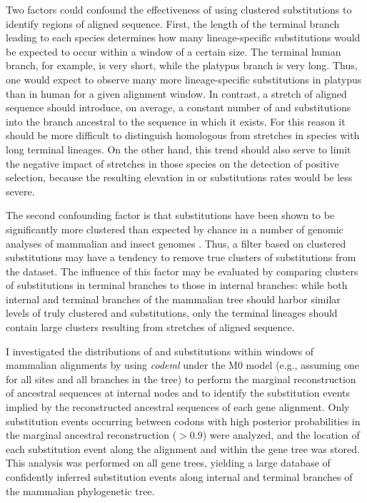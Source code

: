 Two factors could confound the effectiveness of using clustered
substitutions to identify regions of \nhom aligned sequence. First,
the length of the terminal branch leading to each species determines
how many lineage-specific substitutions would be expected to occur
within a window of a certain size. The terminal human branch, for
example, is very short, while the platypus branch is very long. Thus,
one would expect to observe many more lineage-specific substitutions
in platypus than in human for a given alignment window. In contrast, a
stretch of \nhom aligned sequence should introduce, on average, a
constant number of \nsyn and \syn substitutions into the branch
ancestral to the sequence in which it exists. For this reason it
should be more difficult to distinguish homologous from \nhom
stretches in species with long terminal lineages. On the other hand,
this trend should also serve to limit the negative impact of \nhom
stretches in those species on the detection of positive selection,
because the resulting elevation in \nsyn or \syn substitutions rates
would be less severe.

The second confounding factor is that \nsyn substitutions have been
shown to be significantly more clustered than expected by chance in a
number of genomic analyses of mammalian and insect genomes
\citep{Callahan2011,Bazykin2004,Wang2007}. Thus, a filter based on
clustered \nsyn substitutions may have a tendency to remove true
clusters of \nsyn substitutions from the dataset. The influence of
this factor may be evaluated by comparing clusters of substitutions in
terminal branches to those in internal branches: while both internal
and terminal branches of the mammalian tree should harbor similar
levels of truly clustered \nsyn and \syn substitutions, only the
terminal lineages should contain large clusters resulting from
stretches of aligned \nhom sequence.

I investigated the distributions of \nsyn and \syn substitutions
within windows of mammalian alignments by using \emph{codeml}
\citep{Yang2007PAML} under the M0 model (e.g., assuming one \omg for
all sites and all branches in the tree) to perform the marginal
reconstruction of ancestral sequences at internal nodes
\citep{Yang1995} and to identify the substitution events implied by
the reconstructed ancestral sequences of each gene alignment. Only
substitution events occurring between codons with high posterior
probabilities in the marginal ancestral reconstruction ($>0.9$) were
analyzed, and the location of each substitution event along the
alignment and within the gene tree was stored. This analysis was
performed on all gene trees, yielding a large database of confidently
inferred substitution events along internal and terminal branches of
the mammalian phylogenetic tree.

